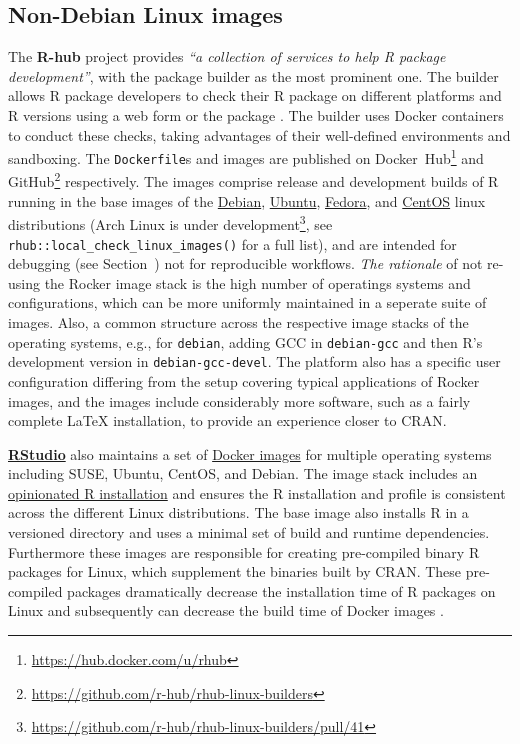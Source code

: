 \hypertarget{non-debian-linux-images}{%
\subsection{Non-Debian Linux images}\label{non-debian-linux-images}}

\label{nondebian}

\label{rhub} The \textbf{R-hub} project provides \emph{``a collection of
services to help R package development''}, with the package builder as
the most prominent one\citep{r-hub_docs_2019}. The builder allows R
package developers to check their R package on different platforms and R
versions using a web form or the package 
\citep{csardi_rhub_2019}. The builder uses Docker containers to conduct
these checks, taking advantages of their well-defined environments and
sandboxing. The \texttt{Dockerfile}s and images are published on
Docker~Hub\footnote{\href{https://hub.docker.com/u/rhub}{https://hub.docker.com/u/rhub}}
and
GitHub\footnote{\href{https://github.com/r-hub/rhub-linux-builders}{https://github.com/r-hub/rhub-linux-builders}}
respectively. The images comprise release and development builds of R
running in the base images of the
\href{https://www.debian.org/}{Debian},
\href{https://ubuntu.com/}{Ubuntu},
\href{https://getfedora.org/}{Fedora}, and
\href{https://centos.org/}{CentOS} linux distributions (Arch Linux is
under
development\footnote{\href{https://github.com/r-hub/rhub-linux-builders/pull/41}{https://github.com/r-hub/rhub-linux-builders/pull/41}},
see \texttt{rhub::local\_check\_linux\_images()} for a full list), and
are intended for debugging (see Section~) not for
reproducible workflows. \emph{The rationale} of not re-using the Rocker
image stack is the high number of operatings systems and configurations,
which can be more uniformly maintained in a seperate suite of images.
Also, a common structure across the respective image stacks of the
operating systems, e.g., for \texttt{debian}, adding GCC in
\texttt{debian-gcc} and then R's development version in
\texttt{debian-gcc-devel}. The platform also has a specific user
configuration differing from the setup covering typical applications of
Rocker images, and the images include considerably more software, such
as a fairly complete LaTeX installation, to provide an experience closer
to CRAN.

\href{https://rstudio.com/}{\textbf{RStudio}} also maintains a set of
\href{https://github.com/rstudio/r-docker}{Docker images} for multiple
operating systems including SUSE, Ubuntu, CentOS, and Debian. The image
stack includes an \href{https://github.com/rstudio/r-builds}{opinionated
R installation} and ensures the R installation and profile is consistent
across the different Linux distributions. The base image also installs R
in a versioned directory and uses a minimal set of build and runtime
dependencies. Furthermore these images are responsible for creating
pre-compiled binary R packages for Linux, which supplement the binaries
built by CRAN. These pre-compiled packages dramatically decrease the
installation time of R packages on Linux and subsequently can decrease
the build time of Docker images \citep{lopp_package_2019}.

